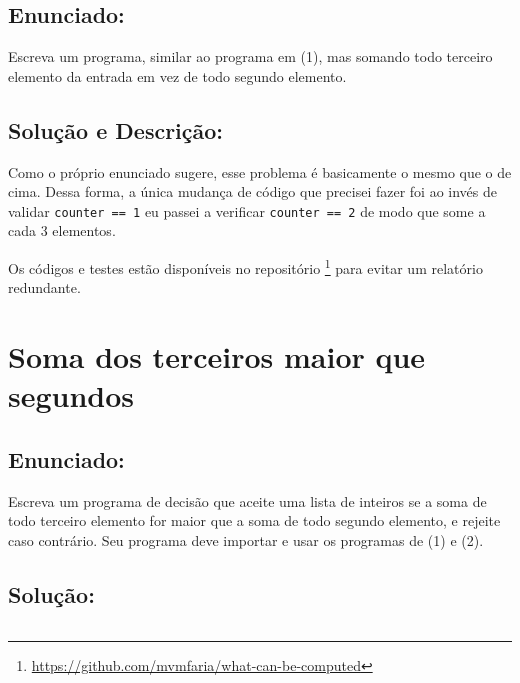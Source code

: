 \documentclass[9pt,a4paper,twocolumn,twoside]{tau-class/tau}
\begin{document}
    \subsection{Enunciado:}

        \begin{tauenv}[frametitle = Soma de todo terceiro inteiro.]
                Escreva um programa, similar ao programa em (1), mas somando todo terceiro elemento da entrada
                em vez de todo segundo elemento.
        \end{tauenv}
        
    \subsection{Solução e Descrição:}

        Como o próprio enunciado sugere, esse problema é basicamente o mesmo que o de cima. Dessa forma, a única mudança de código que precisei fazer foi ao invés de validar \texttt{counter == 1} eu passei a verificar \texttt{counter == 2} de modo que some a cada 3 elementos.

        Os códigos e testes estão disponíveis no repositório \footnote{\url{https://github.com/mvmfaria/what-can-be-computed}} para evitar um relatório redundante.
    
\section{Soma dos terceiros maior que segundos}

    \subsection{Enunciado:}
	
        \begin{tauenv}[frametitle = Soma dos terceiros maior que segundos.]
                Escreva um programa de decisão que aceite uma lista de inteiros se a soma de todo terceiro
                elemento for maior que a soma de todo segundo elemento, e rejeite caso contrário. Seu programa
                deve importar e usar os programas de (1) e (2).
        \end{tauenv}

    \subsection{Solução:}

        \inputminted{python}{src/6/6.py}
		
\end{document}
